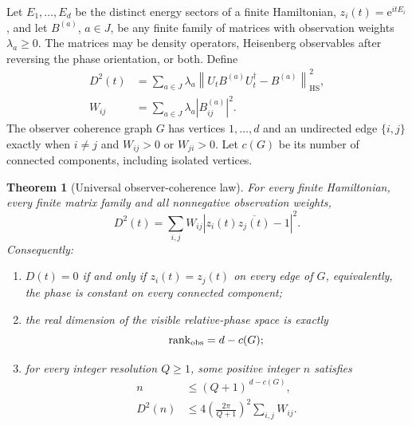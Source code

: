\documentclass[10pt]{article}
\newtheorem{theorem}{Theorem}
\theoremstyle{definition}
\newcommand{\HS}{\mathrm{HS}}
\newcommand{\ee}{\mathrm e}
\begin{document}
Let \(E_1,\ldots,E_d\) be the distinct energy sectors of a finite Hamiltonian,
\(z_i(t)=\ee^{itE_i}\), and let \(B^{(a)}\), \(a\in J\), be any finite family
of matrices with observation weights \(\lambda_a\geq0\).  The matrices may be
density operators, Heisenberg observables after reversing the phase
orientation, or both.  Define
\begin{align}
 D^2(t)&=\sum_{a\in J}\lambda_a
   \left\|U_tB^{(a)}U_t^\dagger-B^{(a)}\right\|_{\HS}^2,
 \label{eq:observer-distance}\\
 W_{ij}&=\sum_{a\in J}\lambda_a|B^{(a)}_{ij}|^2.
 \label{eq:observer-weight}
\end{align}
The observer coherence graph \(G\) has vertices \(1,\ldots,d\) and an
undirected edge \(\{i,j\}\) exactly when \(i\ne j\) and
\(W_{ij}>0\) or \(W_{ji}>0\).  Let \(c(G)\) be its number of connected
components, including isolated vertices.

\begin{theorem}[Universal observer-coherence law]
\label{thm:graph}
For every finite Hamiltonian, every finite matrix family and all nonnegative
observation weights,
\begin{equation}
\boxed{
 D^2(t)=\sum_{i,j}W_{ij}
 \left|z_i(t)\overline{z_j(t)}-1\right|^2.}
\label{eq:phase-energy}
\end{equation}
Consequently:
\begin{enumerate}[leftmargin=2.1em,label=(\roman*)]
 \item \(D(t)=0\) if and only if \(z_i(t)=z_j(t)\) on every edge of \(G\),
 equivalently, the phase is constant on every connected component;
 \item the real dimension of the visible relative-phase space is exactly
 \begin{equation}
   \operatorname{rank}_{\rm obs}=d-c(G);
   \label{eq:graph-rank}
 \end{equation}
 \item for every integer resolution \(Q\geq1\), some positive integer
 \(n\) satisfies
 \begin{align}
  n&\leq(Q+1)^{\,d-c(G)}, \label{eq:graph-deadline}\\
  D^2(n)&\leq
    4\left(\frac{2\pi}{Q+1}\right)^2\sum_{i,j}W_{ij}.
  \label{eq:graph-error}
 \end{align}
\end{enumerate}
\end{theorem}
\end{document}

